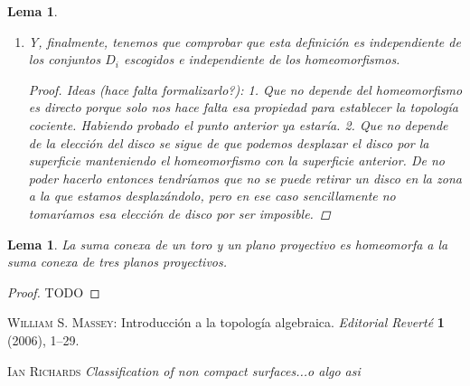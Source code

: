 \documentclass[a4paper,11pt,spanish, twoside, leqno]{tfg-uam}
\newtheorem{lema}[teor]{Lema}
\theoremstyle{definition}
\begin{document}
\begin{lema}
\begin{enumerate}
\begin{proof}
		\end{proof}
		\item 
		Y, finalmente, tenemos que comprobar que esta definición es independiente de los conjuntos $D_i$ escogidos e independiente de los homeomorfismos.
		\begin{proof}
			Ideas (hace falta formalizarlo?):
			1. Que no depende del homeomorfismo es directo porque solo nos hace falta esa propiedad para establecer la topología cociente. Habiendo probado el punto anterior ya estaría.
			2. Que no depende de la elección del disco se sigue de que podemos desplazar el disco por la superficie manteniendo el homeomorfismo con la superficie anterior. De no poder hacerlo entonces tendríamos que no se puede retirar un disco en la zona a la que estamos desplazándolo, pero en ese caso sencillamente no tomaríamos esa elección de disco por ser imposible.
		\end{proof}
	\end{enumerate} 
\end{lema}


\begin{lema}\label{lema:planop+toro=3planop}
La suma conexa de un toro y un plano proyectivo es homeomorfa a la suma conexa de tres planos proyectivos.
\end{lema}
\begin{proof}
TODO
\end{proof}














\begin{thebibliography}{10}

    \textsc{William S. Massey}: 
    Introducción a la topología algebraica. 
    \textit{Editorial Reverté} {\bf1} (2006), 1--29.

    \textsc{Ian Richards}
    \textit{Classification of non compact surfaces...o algo asi}
    
    
\end{thebibliography}
\cleardoublepage
\end{document}
